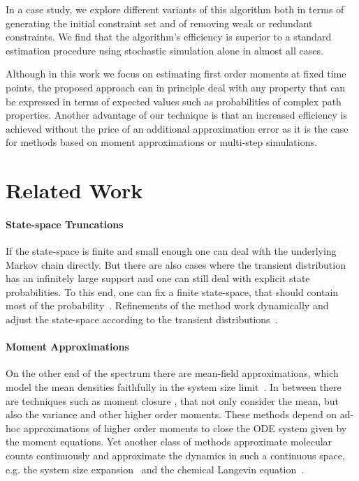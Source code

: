 In a case study, we explore different variants of this algorithm
both in terms of generating the initial constraint set and of
removing  weak or redundant constraints.
We find that the algorithm's efficiency is superior to a standard estimation procedure
using stochastic simulation alone
in almost all cases.

Although in this work we focus on  estimating first order moments at
fixed time points, the proposed approach can in principle deal with any property that can
be expressed in terms of expected values such as probabilities
of complex path properties.
Another advantage of our technique is that an increased efficiency is achieved without the price of an additional approximation error as it is the case for methods based on moment approximations or multi-step simulations.

\section{Related Work}\label{sec:cv:related}
\paragraph{State-space Truncations}
If the state-space is finite and small enough one can deal with the underlying Markov
chain directly.
But there are also  cases where the transient distribution has an infinitely large support
and one can still deal with explicit state probabilities.
To this end, one can fix a finite state-space, that should contain most of the
probability~\parencite{munsky2006finite}. Refinements of the method work
dynamically and adjust the state-space according to the transient
distributions~\parencite{andreychenko2011parameter,henzinger2009sliding,mateescu2010fast}.

\paragraph{Moment Approximations}
On the other end of the spectrum there are mean-field approximations, 
which model the mean densities faithfully in the system size limit~\parencite{bortolussi2013continuous}.
In between there are techniques such as moment closure \parencite{singh2006lognormal}, that
not only consider the mean, but also the variance and other higher order moments.
These methods depend on ad-hoc approximations of higher order moments to
close the \ac{ODE} system given by the moment equations.
Yet another class of methods approximate molecular counts continuously and approximate the dynamics in such a continuous space, e.g. the system size expansion~\parencite{van1992stochastic} and the
chemical Langevin equation~\parencite{gillespie2000chemical}.

